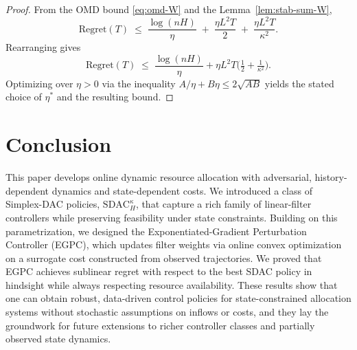 \documentclass[11pt]{article}
\begin{document}
\begin{proof}
From the OMD bound \eqref{eq:omd-W} and the Lemma~\ref{lem:stab-sum-W},
\[
\mathrm{Regret}(T)
\;\le\;
\frac{\log(nH)}{\eta}
\;+\;
\frac{\eta L^2 T}{2}
\;+\;
\frac{\eta L^2 T}{\kappa^2}.
\]
Rearranging gives
\[
\mathrm{Regret}(T)
\;\le\;
\frac{\log(n H)}{\eta} + \eta L^2 T\Big(\tfrac{1}{2}+\tfrac{1}{\kappa^2}\Big).
\]
Optimizing over \(\eta > 0\) via the inequality \(A/\eta + B\eta \le 2\sqrt{AB}\) yields the stated choice of \(\eta^*\) and the resulting bound.
\end{proof}






\section{Conclusion}
\label{sec:control_conclusion}

This paper develops online dynamic resource allocation with adversarial, history-dependent dynamics and state-dependent costs. We introduced a class of Simplex-DAC policies, \(\mathrm{SDAC}_H^\kappa\), that capture a rich family of linear-filter controllers while preserving feasibility under state constraints. Building on this parametrization, we designed the Exponentiated-Gradient Perturbation Controller (EGPC), which updates filter weights via online convex optimization on a surrogate cost constructed from observed trajectories. We proved that EGPC achieves sublinear regret with respect to the best SDAC policy in hindsight while always respecting resource availability. These results show that one can obtain robust, data-driven control policies for state-constrained allocation systems without stochastic assumptions on inflows or costs, and they lay the groundwork for future extensions to richer controller classes and partially observed state dynamics.



\end{document}
